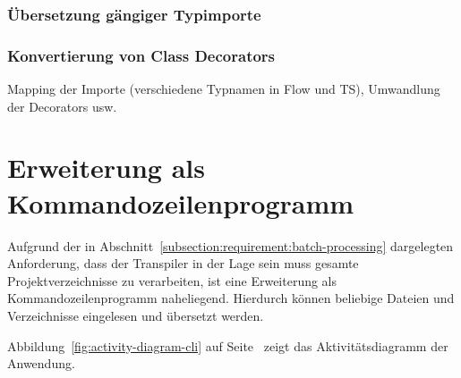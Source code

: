     \subsubsection{Übersetzung gängiger Typimporte}
    \subsubsection{Konvertierung von Class Decorators}

  Mapping der Importe (verschiedene Typnamen in Flow und TS), Umwandlung der Decorators usw.

\section{Erweiterung als Kommandozeilenprogramm}

Aufgrund der in Abschnitt~\ref{subsection:requirement:batch-processing} dargelegten Anforderung, dass der Transpiler in der Lage sein muss gesamte Projektverzeichnisse zu verarbeiten, ist eine Erweiterung als Kommandozeilenprogramm naheliegend. Hierdurch können beliebige Dateien und Verzeichnisse eingelesen und übersetzt werden.


Abbildung~\ref{fig:activity-diagram-cli} auf Seite~\pageref{fig:activity-diagram-cli} zeigt das Aktivitätsdiagramm der Anwendung.

